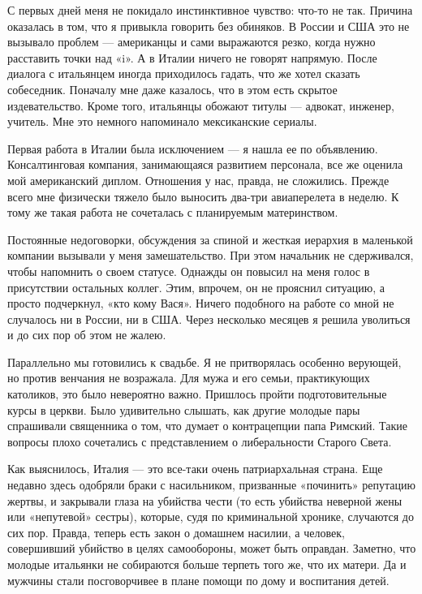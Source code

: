 С первых дней меня не покидало инстинктивное чувство: что-то не так. Причина оказалась в том, что я привыкла говорить без обиняков. В России и США это не вызывало проблем — американцы и сами выражаются резко, когда нужно расставить точки над «i». А в Италии ничего не говорят напрямую. После диалога с итальянцем иногда приходилось гадать, что же хотел сказать собеседник. Поначалу мне даже казалось, что в этом есть скрытое издевательство. Кроме того, итальянцы обожают титулы — адвокат, инженер, учитель. Мне это немного напоминало мексиканские сериалы.

Первая работа в Италии была исключением — я нашла ее по объявлению. Консалтинговая компания, занимающаяся развитием персонала, все же оценила мой американский диплом. Отношения у нас, правда, не сложились. Прежде всего мне физически тяжело было выносить два-три авиаперелета в неделю. К тому же такая работа не сочеталась с планируемым материнством.

Постоянные недоговорки, обсуждения за спиной и жесткая иерархия в маленькой компании вызывали у меня замешательство. При этом начальник не сдерживался, чтобы напомнить о своем статусе. Однажды он повысил на меня голос в присутствии остальных коллег. Этим, впрочем, он не прояснил ситуацию, а просто подчеркнул, «кто кому Вася». Ничего подобного на работе со мной не случалось ни в России, ни в США. Через несколько месяцев я решила уволиться и до сих пор об этом не жалею.

Параллельно мы готовились к свадьбе. Я не притворялась особенно верующей, но против венчания не возражала. Для мужа и его семьи, практикующих католиков, это было невероятно важно. Пришлось пройти подготовительные курсы в церкви. Было удивительно слышать, как другие молодые пары спрашивали священника о том, что думает о контрацепции папа Римский. Такие вопросы плохо сочетались с представлением о либеральности Старого Света.

Как выяснилось, Италия — это все-таки очень патриархальная страна. Еще недавно здесь одобряли браки с насильником, призванные «починить» репутацию жертвы, и закрывали глаза на убийства чести (то есть убийства неверной жены или «непутевой» сестры), которые, судя по криминальной хронике, случаются до сих пор. Правда, теперь есть закон о домашнем насилии, а человек, совершивший убийство в целях самообороны, может быть оправдан. Заметно, что молодые итальянки не собираются больше терпеть того же, что их матери. Да и мужчины стали посговорчивее в плане помощи по дому и воспитания детей.

